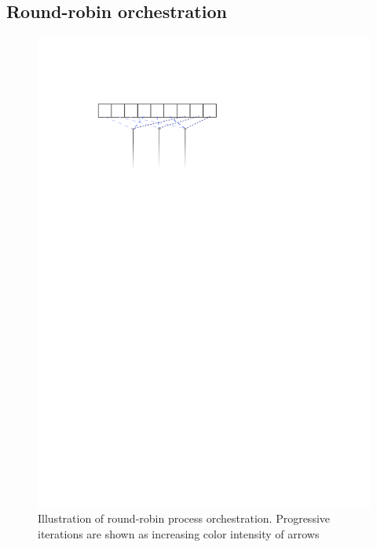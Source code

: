 
\subsection{Round-robin orchestration}
\begin{figure}
\centering
\includegraphics{figures/roundrobin}

\caption[Round-robin orchestration]{Illustration of round-robin
  process orchestration. Progressive iterations are shown as
  increasing color intensity of arrows}

\label{fig:roundrobin}

\end{figure}


